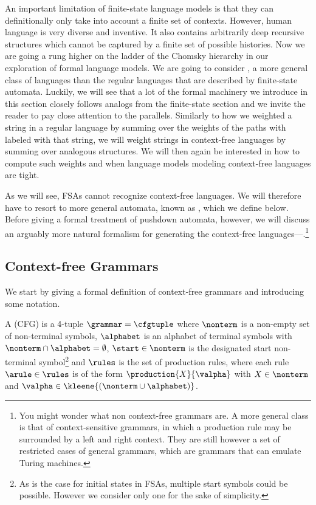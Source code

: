An important limitation of finite-state language models is that they can definitionally only take into account a finite set of contexts. 
However, human language is very diverse and inventive.
It also contains arbitrarily deep recursive structures which cannot be captured by a finite set of possible histories.
Now we are going a rung higher on the ladder of the Chomsky hierarchy in our exploration of formal language models. 
We are going to consider , a more general class of languages than the regular languages that are described by finite-state automata.
Luckily, we will see that a lot of the formal machinery we introduce in this section closely follows analogs from the finite-state section and we invite the reader to pay close attention to the parallels.
Similarly to how we weighted a string in a regular language by summing over the weights of the paths with labeled with that string, we will weight strings in context-free languages by summing over analogous structures. 
We will then again be interested in how to compute such weights and when language models modeling context-free languages are tight.

As we will see, FSAs cannot recognize context-free languages.
We will therefore have to resort to more general automata, known as , which we define below. 
Before giving a formal treatment of pushdown automata, however, we will discuss an arguably more natural formalism for generating the context-free languages---.\footnote{You might wonder what non context-free grammars are. 
A more general class is that of context-sensitive grammars, in which a production rule may be surrounded by a left and right context. 
They are still however a set of restricted cases of general grammars, which are grammars that can emulate Turing machines.}

\subsection{Context-free Grammars}
We start by giving a formal definition of context-free grammars and introducing some notation.

\begin{definition}
A  (CFG) is a 4-tuple $\grammar = \cfgtuple$ where $\nonterm$ is a non-empty set of non-terminal symbols, $\alphabet$ is an alphabet of terminal symbols with $\nonterm \cap \alphabet = \emptyset$, $\start\in\nonterm$ is the designated start non-terminal symbol\footnote{As is the case for initial states in FSAs, multiple start symbols could be possible. However we consider only one for the sake of simplicity.} and $\rules$ is the set of production rules, where each rule $\arule \in \rules$ is of the form $\production{X}{\valpha}$ with $X\in\nonterm$ and $\valpha\in\kleene{(\nonterm\cup \alphabet)}$.
\end{definition}


